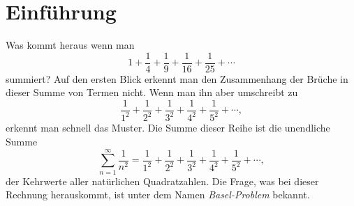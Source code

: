 %
%
%
%
\section{Einführung
\label{basel:section:einfuehrung}}
 
Was kommt heraus wenn man
\[
    1 + \frac{1}{4} + \frac{1}{9} + \frac{1}{16} + \frac{1}{25} + \cdots
\]
summiert? Auf den ersten Blick erkennt man den Zusammenhang der Brüche in dieser Summe von Termen nicht.
Wenn man ihn aber umschreibt zu
\[
    \frac{1}{1^2} + \frac{1}{2^2} + \frac{1}{3^2} + \frac{1}{4^2} + \frac{1}{5^2} + \cdots,
\]
erkennt man schnell das Muster.
Die Summe dieser Reihe ist die unendliche Summe
\[
    \sum_{n=1}^{\infty} \frac{1}{n^2}
    =
    \frac{1}{1^2} + \frac{1}{2^2} + \frac{1}{3^2} + \frac{1}{4^2} + \frac{1}{5^2} + \cdots,
\]
der Kehrwerte aller natürlichen Quadratzahlen.
Die Frage, was bei dieser Rechnung herauskommt, ist unter dem Namen \emph{Basel-Problem} bekannt.
